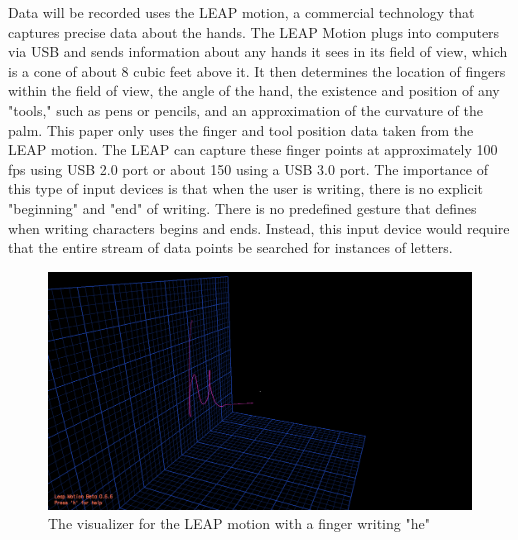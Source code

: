 Data will be recorded uses the LEAP motion, a commercial technology that captures precise data about the hands.
The LEAP Motion plugs into computers via USB and sends information about any hands it sees in its field of view, which is a cone of about 8 cubic feet above it.
It then determines the location of fingers within the field of view, the angle of the hand, the existence and position of any "tools," such as pens or pencils, and an approximation of the curvature of the palm.
This paper only uses the finger  and tool position data taken from the LEAP motion. The LEAP can capture these finger points at approximately 100 fps using USB 2.0 port or about 150 using a USB 3.0 port.
The importance of this type of input devices is that when the user is writing, there is no explicit "beginning" and "end" of writing. There is no predefined gesture that defines when writing characters begins and ends. Instead, this input device would require that the entire stream of data points be searched for instances of letters. 
\begin{figure}
  \begin{center}
  \includegraphics[width=\columnwidth]{images/he-3d-2.PNG}
  \caption{The visualizer for the LEAP motion with a finger writing "he"}
  \label{fig:teaser}
  \end{center}  
\end{figure}
